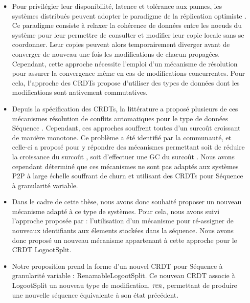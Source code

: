 \begin{itemize}
    \item Pour privilégier leur disponibilité, latence et tolérance aux pannes, les systèmes distribués peuvent adopter le paradigme de la réplication optimiste \cite{2005-optimistic-replication-saito}.
        Ce paradigme consiste à relaxer la cohérence de données entre les noeuds du système pour leur permettre de consulter et modifier leur copie locale sans se coordonner.
        Leur copies peuvent alors temporairement diverger avant de converger de nouveau une fois les modifications de chacun propagées.
        Cependant, cette approche nécessite l'emploi d'un mécanisme de résolution pour assurer la convergence même en cas de modifications concurrentes.
        Pour cela, l'approche des \acp{CRDT} \cite{2007-crdt-shapiro,shapiro_2011_crdt} propose d'utiliser des types de données dont les modifications sont nativement commutatives.
    \item Depuis la spécification des \acp{CRDT}, la littérature a proposé plusieurs de ces mécanismes résolution de conflits automatiques pour le type de données Séquence \cite{2006-woot-oster,ROH2011354,2009-treedoc-preguica,2009-logoot-weiss}.
        Cependant, ces approches souffrent toutes d'un surcoût croissant de manière monotone.
        Ce problème a été identifié par la communauté, et celle-ci a proposé pour y répondre des mécanismes permettant soit de réduire la croissance du surcoût \cite{lseq2013,lseq2017}, soit d'effectuer une \ac{GC} du surcoût \cite{ROH2011354,letia:hal-01248270,zawirski:hal-01248197}.
        Nous avons cependant déterminé que ces mécanismes ne sont pas adaptés aux systèmes \ac{P2P} à large échelle souffrant de churn et utilisant des \acp{CRDT} pour Séquence à granularité variable.
    \item Dans le cadre de cette thèse, nous avons donc souhaité proposer un nouveau mécanisme adapté à ce type de systèmes.
        Pour cela, nous avons suivi l'approche proposée par \cite{letia:hal-01248270,zawirski:hal-01248197} : l'utilisation d'un mécanisme pour ré-assigner de nouveaux identifiants aux élements stockées dans la séquence.
        Nous avons donc proposé un nouveau mécanisme appartenant à cette approche pour le \ac{CRDT} LogootSplit.
    \item Notre proposition prend la forme d'un nouvel \ac{CRDT} pour Séquence à granularité variable : RenamableLogootSplit.
        Ce nouveau \ac{CRDT} associe à LogootSplit un nouveau type de modification, $\mathit{ren}$, permettant de produire une nouvelle séquence équivalente à son état précédent.

\end{itemize}
